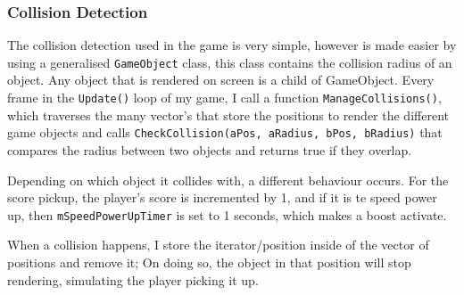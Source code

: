 \documentclass[10pt]{report}
\begin{document}
\subsubsection*{Collision Detection}
The collision detection used in the game is very simple, however is made easier by using a generalised \colorbox{mygrey}{\lstinline{GameObject}} class, this class contains the collision radius of an object. Any object that is rendered on screen is a child of GameObject. Every frame in the \colorbox{mygrey}{\lstinline{Update()}} loop of my game, I call a function \colorbox{mygrey}{\lstinline{ManageCollisions()}}, which traverses the many vector's that store the positions to render the different game objects and calls \colorbox{mygrey}{\lstinline{CheckCollision(aPos, aRadius, bPos, bRadius)}} that compares the radius between two objects and returns true if they overlap.

Depending on which object it collides with, a different behaviour occurs. For the score pickup, the player's score is incremented by 1, and if it is te speed power up, then \colorbox{mygrey}{\lstinline{mSpeedPowerUpTimer}} is set to 1 seconds, which makes a boost activate. 

When a collision happens, I store the iterator/position inside of the vector of positions and remove it; On doing so, the object in that position will stop rendering, simulating the player picking it up.
\end{document}
